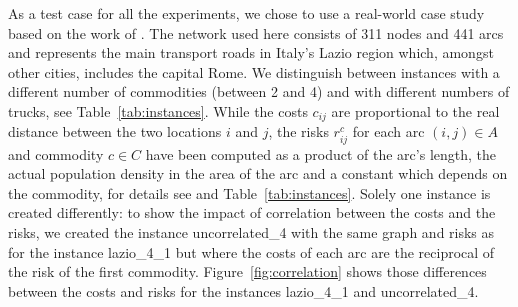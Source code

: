 \documentclass[preprint,12pt]{elsarticle}
\begin{document}
As a test case for all the experiments, we chose to use a real-world case study based on the work of \citet{bcg2009a}. The network used here consists of 311 nodes and 441 arcs and represents the main transport roads in Italy's Lazio region which, amongst other cities, includes the capital Rome. We distinguish between instances with a different number of commodities (between 2 and 4) and with different numbers of trucks, see Table~\ref{tab:instances}. While the costs $c_{ij}$ are proportional to the real distance between the two locations $i$ and $j$, the risks $r_{ij}^c$ for each arc $(i,j) \in A$ and commodity $c \in C$ have been computed as a product of the arc's length, the actual population density in the area of the arc and a constant which depends on the commodity, for details see \citep{bcg2009a} and Table~\ref{tab:instances}. Solely one instance is created differently: to show the impact of correlation between the costs and the risks, we created the instance uncorrelated\_4 with the same graph and risks as for the instance lazio\_4\_1 but where the costs of each arc are the reciprocal of the risk of the first commodity. Figure~\ref{fig:correlation} shows those differences between the costs and risks for the instances lazio\_4\_1 and uncorrelated\_4.
\end{document}
